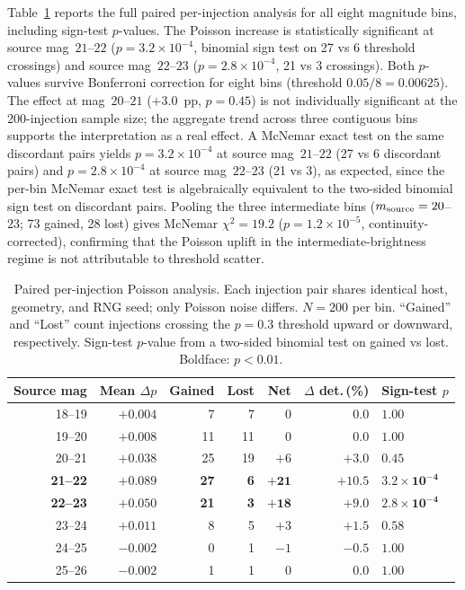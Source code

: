 \documentclass[fleqn,usenatbib]{mnras}
\begin{document}
Table~\ref{tab:paired_delta} reports the full paired per-injection analysis for all eight magnitude bins, including sign-test $p$-values.  The Poisson increase is statistically significant at source mag~$21$--$22$ ($p = 3.2 \times 10^{-4}$, binomial sign test on 27 vs 6 threshold crossings) and source mag~$22$--$23$ ($p = 2.8 \times 10^{-4}$, 21 vs 3 crossings).  Both $p$-values survive Bonferroni correction for eight bins (threshold $0.05/8 = 0.00625$).  The effect at mag~$20$--$21$ ($+3.0$~pp, $p = 0.45$) is not individually significant at the 200-injection sample size; the aggregate trend across three contiguous bins supports the interpretation as a real effect.  A McNemar exact test on the same discordant pairs yields $p = 3.2 \times 10^{-4}$ at source mag~$21$--$22$ (27 vs 6 discordant pairs) and $p = 2.8 \times 10^{-4}$ at source mag~$22$--$23$ (21 vs 3), as expected, since the per-bin McNemar exact test is algebraically equivalent to the two-sided binomial sign test on discordant pairs.  Pooling the three intermediate bins ($m_{\rm source} = 20$--$23$; 73 gained, 28 lost) gives McNemar $\chi^{2} = 19.2$ ($p = 1.2 \times 10^{-5}$, continuity-corrected), confirming that the Poisson uplift in the intermediate-brightness regime is not attributable to threshold scatter.

\begin{table}
\centering
\caption{Paired per-injection Poisson analysis.  Each injection pair shares identical host, geometry, and RNG seed; only Poisson noise differs.  $N = 200$ per bin.  ``Gained'' and ``Lost'' count injections crossing the $p = 0.3$ threshold upward or downward, respectively.  Sign-test $p$-value from a two-sided binomial test on gained vs lost.  Boldface: $p < 0.01$.}
\label{tab:paired_delta}
\small
\setlength{\tabcolsep}{4pt}
\begin{tabular}{rrrrrrl}
\hline
Source mag & Mean $\Delta p$ & Gained & Lost & Net & $\Delta$ det.\,(\%) & Sign-test $p$ \\
\hline
18--19 & $+0.004$ & 7 & 7 & 0 & $0.0$ & $1.00$ \\
19--20 & $+0.008$ & 11 & 11 & 0 & $0.0$ & $1.00$ \\
20--21 & $+0.038$ & 25 & 19 & $+6$ & $+3.0$ & $0.45$ \\
\textbf{21--22} & $\mathbf{+0.089}$ & \textbf{27} & \textbf{6} & $\mathbf{+21}$ & $\mathbf{+10.5}$ & $\mathbf{3.2 \times 10^{-4}}$ \\
\textbf{22--23} & $\mathbf{+0.050}$ & \textbf{21} & \textbf{3} & $\mathbf{+18}$ & $\mathbf{+9.0}$ & $\mathbf{2.8 \times 10^{-4}}$ \\
23--24 & $+0.011$ & 8 & 5 & $+3$ & $+1.5$ & $0.58$ \\
24--25 & $-0.002$ & 0 & 1 & $-1$ & $-0.5$ & $1.00$ \\
25--26 & $-0.002$ & 1 & 1 & 0 & $0.0$ & $1.00$ \\
\hline
\end{tabular}
\end{table}
\end{document}
